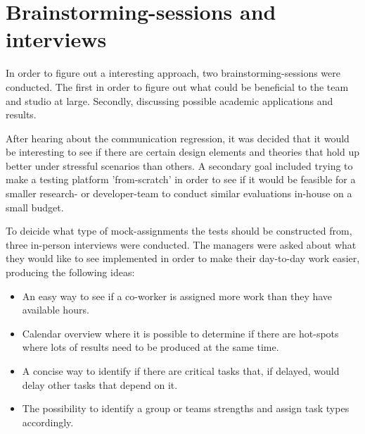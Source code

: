 \documentclass[nofilelist,dvipsnames]{cslthse-msc}
\begin{document}
		\section{Brainstorming-sessions and interviews}{\label{label_sectionIdeas}

      In order to figure out a interesting approach, two brainstorming-sessions
      were conducted. The first in order to figure out what could be beneficial
      to the team and studio at large. Secondly, discussing possible academic
      applications and results.

      After hearing about the communication regression, it was decided that
      it would be interesting to see if there are certain design elements and
      theories that hold up better under stressful scenarios than others. A
      secondary goal included trying to make a testing platform 'from-scratch'
      in order to see if it would be feasible for a smaller research- or
      developer-team to conduct similar evaluations in-house on a small budget.

      To deicide what type of mock-assignments the tests should be constructed
      from, three in-person interviews were conducted. The managers were asked
      about what they would like to see implemented in order to make their
      day-to-day work easier, producing the following ideas:

      \newcommand{\ideaOne}{%
        An easy way to see if a co-worker is assigned more work than they have
        available hours.%
      }

      \newcommand{\ideaTwo}{%
        Calendar overview where it is possible to determine if there are
        hot-spots where lots of results need to be produced at the same
        time.%
      }

      \newcommand{\ideaThree}{%
        A concise way to identify if there are critical tasks that, if
        delayed, would delay other tasks that depend on it.%
      }

      \newcommand{\ideaFour}{%
        The possibility to identify a group or teams strengths and assign
        task types accordingly.%
      }

      \begin{itemize}
        \item{\ideaOne\label{label_ideas}}
        \item{\ideaTwo}
        \item{\ideaThree}
        \item{\ideaFour}
      \end{itemize}


}
\end{document}
